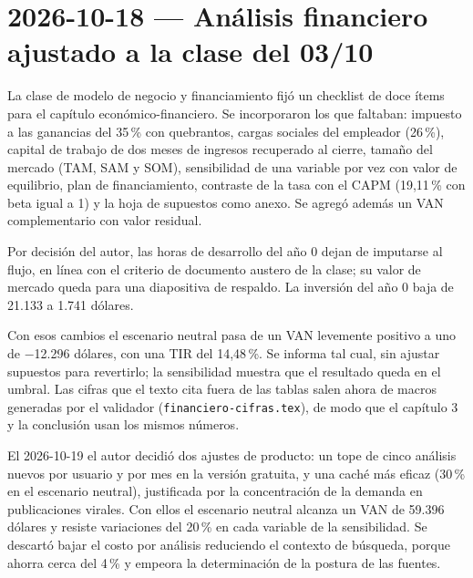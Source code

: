 \section{2026-10-18 — Análisis financiero ajustado a la clase del 03/10}

La clase de modelo de negocio y financiamiento fijó un checklist de doce ítems para el capítulo económico-financiero. Se incorporaron los que faltaban: impuesto a las ganancias del 35\,\% con quebrantos, cargas sociales del empleador (26\,\%), capital de trabajo de dos meses de ingresos recuperado al cierre, tamaño del mercado (TAM, SAM y SOM), sensibilidad de una variable por vez con valor de equilibrio, plan de financiamiento, contraste de la tasa con el CAPM (19,11\,\% con beta igual a 1) y la hoja de supuestos como anexo. Se agregó además un VAN complementario con valor residual.

Por decisión del autor, las horas de desarrollo del año 0 dejan de imputarse al flujo, en línea con el criterio de documento austero de la clase; su valor de mercado queda para una diapositiva de respaldo. La inversión del año 0 baja de 21.133 a 1.741 dólares.

Con esos cambios el escenario neutral pasa de un VAN levemente positivo a uno de $-$12.296 dólares, con una TIR del 14,48\,\%. Se informa tal cual, sin ajustar supuestos para revertirlo; la sensibilidad muestra que el resultado queda en el umbral. Las cifras que el texto cita fuera de las tablas salen ahora de macros generadas por el validador (\texttt{financiero-cifras.tex}), de modo que el capítulo 3 y la conclusión usan los mismos números.

El 2026-10-19 el autor decidió dos ajustes de producto: un tope de cinco análisis nuevos por usuario y por mes en la versión gratuita, y una caché más eficaz (30\,\% en el escenario neutral), justificada por la concentración de la demanda en publicaciones virales. Con ellos el escenario neutral alcanza un VAN de 59.396 dólares y resiste variaciones del 20\,\% en cada variable de la sensibilidad. Se descartó bajar el costo por análisis reduciendo el contexto de búsqueda, porque ahorra cerca del 4\,\% y empeora la determinación de la postura de las fuentes.

\bigskip
